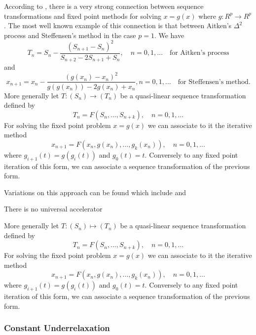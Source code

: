 According to \cite{brezinski}, there is a very strong connection between sequence transformations and fixed point methods for solving \(x=g(x)\) where \(g: R^{p} \to R^{p}\).
The most well known example of this connection is that between Aitken's \(\Delta^{2}\) process and Steffensen's method in the case \(p=1\).
We have
\[T_{n}=S_{n}-\frac{\left(S_{n+1}-S_{n}\right)^{2}}{S_{n+2}-2 S_{n+1}+S_{n}}, \quad n=0,1, \ldots \quad\text{for Aitken's process}\]
and
\[x_{n+1}=x_{n}-\frac{\left(g\left(x_{n}\right)-x_{n}\right)^{2}}{g\left(g\left(x_{n}\right)\right)-2 g\left(x_{n}\right)+x_{n}}, n=0,1, \ldots \quad\text{for Steffensen's method.}\]
More generally let \(T:\left(S_{n}\right) \to\left(T_{n}\right)\) be a quasi-linear sequence transformation defined by
\[
T_{n}=F\left(S_{n}, \ldots, S_{n+k}\right), \quad n=0,1, \ldots
\]
For solving the fixed point problem \(x=g(x)\) we can associate to it the iterative method
\[
x_{n+1}=F\left(x_{n}, g\left(x_{n}\right), \ldots, g_{k}\left(x_{n}\right)\right), \quad n=0,1, \ldots
\]
where \(g_{i+1}(t)=g\left(g_{i}(t)\right)\) and \(g_{0}(t)=t\).
Conversely to any fixed point iteration of this form, we can associate a sequence transformation of the previous form.

Variations on this approach can be found which include \cite{irons_version_1969} and \cite{king}

There is no universal accelerator \cite{brezinski}





More generally let \(T:\left(S_{n}\right) \longmapsto\left(T_{n}\right)\) be a quasi-linear sequence transformation defined by
\[
T_{n}=F\left(S_{n}, \ldots, S_{n+k}\right), \quad n=0,1, \ldots
\]
For solving the fixed point problem \(x=g(x)\) we can associate to it the iterative method
\[
x_{n+1}=F\left(x_{n}, g\left(x_{n}\right), \ldots, g_{k}\left(x_{n}\right)\right), \quad n=0,1, \ldots
\]
where \(g_{i+1}(t)=g\left(g_{i}(t)\right)\) and \(g_{0}(t)=t\). Conversely to any fixed point iteration of this form, we can associate a sequence transformation of the previous form.

\subsubsection{Constant Underrelaxation}

